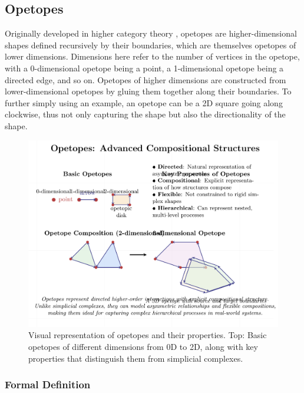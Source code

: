 
\subsection{Opetopes}

Originally developed in higher category theory \citep{cheng2004higher, kock2010polynomial}, opetopes are higher-dimensional shapes defined recursively by their boundaries, which are themselves opetopes of lower dimensions. Dimensions here refer to the number of vertices in the opetope, with a 0-dimensional opetope being a point, a 1-dimensional opetope being a directed edge, and so on. Opetopes of higher dimensions are constructed from lower-dimensional opetopes by gluing them together along their boundaries. To further simply using an example, an opetope can be a 2D square going along clockwise, thus not only capturing the shape but also the directionality of the shape.

\begin{figure}[htbp]
    \centering
    \includegraphics[width=\textwidth]{figures/opetope_structures-1.png}
    \caption{Visual representation of opetopes and their properties. Top: Basic opetopes of different dimensions from 0D to 2D, along with key properties that distinguish them from simplicial complexes.}
    \label{fig:opetope_structures}
\end{figure}

\subsubsection{Formal Definition}

